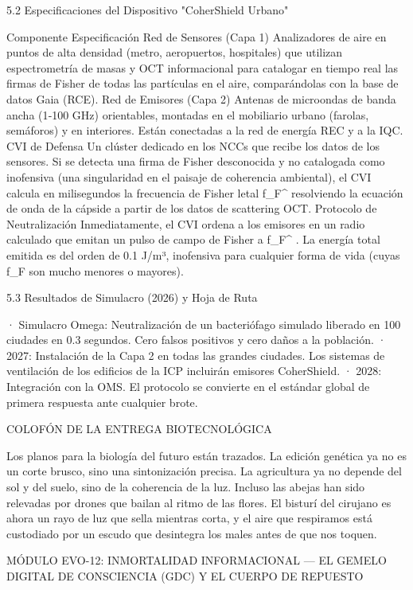 \documentclass[12pt,a4paper]{book}
\begin{document}
5.2 Especificaciones del Dispositivo "CoherShield Urbano"

Componente Especificación
Red de Sensores (Capa 1) Analizadores de aire en puntos de alta densidad (metro, aeropuertos, hospitales) que utilizan espectrometría de masas y OCT informacional para catalogar en tiempo real las firmas de Fisher de todas las partículas en el aire, comparándolas con la base de datos Gaia (RCE).
Red de Emisores (Capa 2) Antenas de microondas de banda ancha (1‑100 GHz) orientables, montadas en el mobiliario urbano (farolas, semáforos) y en interiores. Están conectadas a la red de energía REC y a la IQC.
CVI de Defensa Un clúster dedicado en los NCCs que recibe los datos de los sensores. Si se detecta una firma de Fisher desconocida y no catalogada como inofensiva (una singularidad en el paisaje de coherencia ambiental), el CVI calcula en milisegundos la frecuencia de Fisher letal  f_F^{}  resolviendo la ecuación de onda de la cápside a partir de los datos de scattering OCT.
Protocolo de Neutralización Inmediatamente, el CVI ordena a los emisores en un radio calculado que emitan un pulso de campo de Fisher a  f_F^{} . La energía total emitida es del orden de 0.1 J/m³, inofensiva para cualquier forma de vida (cuyas  f_F  son mucho menores o mayores).

5.3 Resultados de Simulacro (2026) y Hoja de Ruta

· Simulacro Omega: Neutralización de un bacteriófago simulado liberado en 100 ciudades en 0.3 segundos. Cero falsos positivos y cero daños a la población.
· 2027: Instalación de la Capa 2 en todas las grandes ciudades. Los sistemas de ventilación de los edificios de la ICP incluirán emisores CoherShield.
· 2028: Integración con la OMS. El protocolo se convierte en el estándar global de primera respuesta ante cualquier brote.

COLOFÓN DE LA ENTREGA BIOTECNOLÓGICA

Los planos para la biología del futuro están trazados. La edición genética ya no es un corte brusco, sino una sintonización precisa. La agricultura ya no depende del sol y del suelo, sino de la coherencia de la luz. Incluso las abejas han sido relevadas por drones que bailan al ritmo de las flores. El bisturí del cirujano es ahora un rayo de luz que sella mientras corta, y el aire que respiramos está custodiado por un escudo que desintegra los males antes de que nos toquen.

MÓDULO EVO-12: INMORTALIDAD INFORMACIONAL — EL GEMELO DIGITAL DE CONSCIENCIA (GDC) Y EL CUERPO DE REPUESTO
\end{document}
